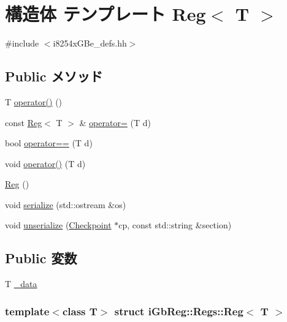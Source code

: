 \hypertarget{structiGbReg_1_1Regs_1_1Reg}{
\section{構造体 テンプレート Reg$<$ T $>$}
\label{structiGbReg_1_1Regs_1_1Reg}
}


{\ttfamily \#include $<$i8254xGBe\_\-defs.hh$>$}\subsection*{Public メソッド}
\begin{DoxyCompactItemize}
\item 
T \hyperlink{structiGbReg_1_1Regs_1_1Reg_aaba2db6079c528211c6b095cdb08fcf6}{operator()} ()
\item 
const \hyperlink{structiGbReg_1_1Regs_1_1Reg}{Reg}$<$ T $>$ \& \hyperlink{structiGbReg_1_1Regs_1_1Reg_ae79c18c14f560a6d39b4111ac120b702}{operator=} (T d)
\item 
bool \hyperlink{structiGbReg_1_1Regs_1_1Reg_a784db2d8753913b11cdf46eae9c2e6a5}{operator==} (T d)
\item 
void \hyperlink{structiGbReg_1_1Regs_1_1Reg_ad75a4d427f25956add1791f7b59fe1cb}{operator()} (T d)
\item 
\hyperlink{structiGbReg_1_1Regs_1_1Reg_a93961d9c207640497631d54c51526721}{Reg} ()
\item 
void \hyperlink{structiGbReg_1_1Regs_1_1Reg_a53e036786d17361be4c7320d39c99b84}{serialize} (std::ostream \&os)
\item 
void \hyperlink{structiGbReg_1_1Regs_1_1Reg_af22e5d6d660b97db37003ac61ac4ee49}{unserialize} (\hyperlink{classCheckpoint}{Checkpoint} $\ast$cp, const std::string \&section)
\end{DoxyCompactItemize}
\subsection*{Public 変数}
\begin{DoxyCompactItemize}
\item 
T \hyperlink{structiGbReg_1_1Regs_1_1Reg_a57c5c9d30605c3947f4972fb48761bee}{\_\-data}
\end{DoxyCompactItemize}
\subsubsection*{template$<$class T$>$ struct iGbReg::Regs::Reg$<$ T $>$}



